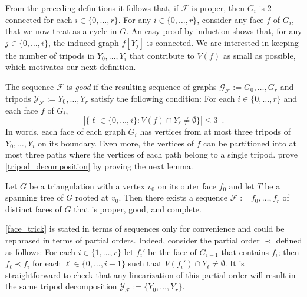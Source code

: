 \documentclass[a4paper,UKenglish,autoref]{lipics-v2021}
\begin{document}
From the preceding definitions it follows that, if $\mathcal{F}$ is proper, then  $G_i$ is $2$-connected for each $i\in\{0,\ldots,r\}$.  For any $i\in\{0,\ldots,r\}$, consider any face $f$ of $G_i$, that we now treat as a cycle in $G$.  An easy proof by induction shows that, for any $j\in\{0,\ldots,i\}$, the induced graph $f[Y_j]$ is connected. %
We are interested in keeping the number of tripods in $Y_0,\ldots,Y_i$ that contribute to $V(f)$ as small as possible, which motivates our next definition.

The sequence $\mathcal{F}$ is \emph{good} if the resulting sequence of graphs $\mathcal{G}_\mathcal{F}:=G_0,\ldots,G_r$ and tripods $\mathcal{Y}_\mathcal{F}:=Y_0,\ldots,Y_r$ satisfy the following condition:  For each $i\in\{0,\ldots, r\}$ and each face $f$ of $G_i$,
\[
   |\{\ell\in\{0,\ldots,i\}: V(f)\cap Y_{\ell}\neq\emptyset\}|\le 3 \enspace .
\]
In words, each face of each graph $G_i$ has vertices from at most three tripods of $Y_0,\ldots,Y_i$ on its boundary.  Even more, the vertices of $f$ can be partitioned into at most three paths where the vertices of each path belong to a single tripod. \citet{dujmovic.joret.ea:planar} prove \cref{tripod_decomposition} by proving the next lemma.


\begin{lem}\label{face_trick}
  Let $G$ be a triangulation with a vertex $v_0$ on its outer face $f_0$ and let $T$ be a spanning tree of $G$ rooted at $v_0$.  Then there exists a sequence $\mathcal{F}:=f_0,\ldots,f_{r}$ of distinct faces of $G$ that is proper, good, and complete.
\end{lem}

\begin{rem}
  \cref{face_trick} is stated in terms of sequences only for convenience and could be rephrased in terms of partial orders. Indeed, consider the partial order $\prec$ defined as follows:  For each $i\in\{1,\ldots,r\}$ let $f_i'$ be the face of $G_{i-1}$ that contains $f_i$; then $f_\ell\prec f_i$ for each $\ell\in\{0,\ldots,i-1\}$ such that $V(f_i')\cap Y_\ell\neq\emptyset$.  It is straightforward to check that any linearization of this partial order will result in the same tripod decomposition $\mathcal{Y_F}:=\{Y_0,\ldots,Y_{r}\}$.
\end{rem}
\end{document}
